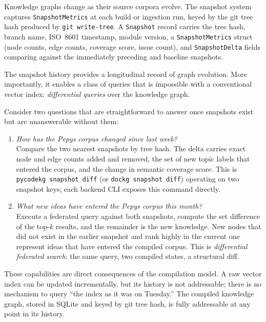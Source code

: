 \documentclass[10pt]{article}
\begin{document}
Knowledge graphs change as their source corpora evolve. The snapshot system
captures \texttt{SnapshotMetrics} at each build or ingestion run, keyed by the
git tree hash produced by \texttt{git write-tree}. A \texttt{Snapshot} record
carries the tree hash, branch name, ISO~8601 timestamp, module version, a
\texttt{SnapshotMetrics} struct (node counts, edge counts, coverage score, issue
count), and \texttt{SnapshotDelta} fields comparing against the immediately
preceding and baseline snapshots.

The snapshot history provides a longitudinal record of graph evolution. More
importantly, it enables a class of queries that is impossible with a conventional
vector index: \emph{differential queries} over the knowledge graph.

Consider two questions that are straightforward to answer once snapshots exist
but are unanswerable without them:

\begin{enumerate}
  \item \emph{How has the Pepys corpus changed since last week?} \\
    Compare the two nearest snapshots by tree hash. The delta carries exact node
    and edge counts added and removed, the set of new topic labels that entered
    the corpus, and the change in semantic coverage score. This is
    \texttt{pycodekg snapshot diff} (or \texttt{dockg snapshot diff}) operating
    on two snapshot keys; each backend CLI exposes this command directly.

  \item \emph{What new ideas have entered the Pepys corpus this month?} \\
    Execute a federated query against both snapshots, compute the set difference
    of the top-$k$ results, and the remainder is the new knowledge. New nodes
    that did not exist in the earlier snapshot and rank highly in the current
    one represent ideas that have entered the compiled corpus. This is
    \emph{differential federated search}: the same query, two compiled states,
    a structural diff.
\end{enumerate}

These capabilities are direct consequences of the compilation model. A raw
vector index can be updated incrementally, but its history is not addressable;
there is no mechanism to query ``the index as it was on Tuesday.'' The compiled
knowledge graph, stored in SQLite and keyed by git tree hash, is fully
addressable at any point in its history.
\end{document}

